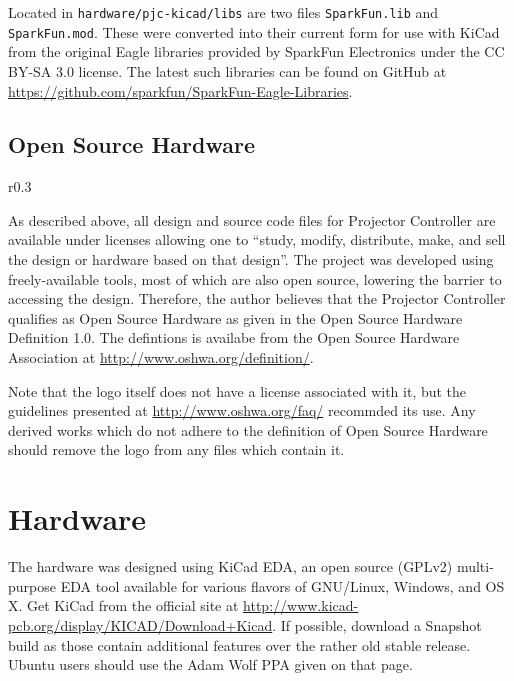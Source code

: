 \documentclass{article}
\begin{document}
Located in \texttt{hardware/pjc-kicad/libs} are two files \texttt{SparkFun.lib} and
\texttt{SparkFun.mod}.  These were converted into their current form for use with KiCad from the
original Eagle libraries provided by SparkFun Electronics under the CC BY-SA 3.0 license.  The
latest such libraries can be found on GitHub at
\url{https://github.com/sparkfun/SparkFun-Eagle-Libraries}.

\subsection{Open Source Hardware}
\begin{wrapfigure}{r}{0.3\textwidth}
    \begin{center}
    \end{center}
\end{wrapfigure}

As described above, all design and source code files for Projector Controller are available under
licenses allowing one to ``study, modify, distribute, make, and sell the design or hardware based on
that design''.  The project was developed using freely-available tools, most of which are also open
source, lowering the barrier to accessing the design.  Therefore, the author believes that the
Projector Controller qualifies as Open Source Hardware as given in the Open Source Hardware
Definition 1.0.  The defintions is availabe from the Open Source Hardware Association at
\url{http://www.oshwa.org/definition/}.

Note that the logo itself does not have a license associated with it, but the guidelines presented
at \url{http://www.oshwa.org/faq/} recommded its use.  Any derived works which do not adhere to the
definition of Open Source Hardware should remove the logo from any files which contain it.


\section{Hardware} \label{Hardware_sec}
The hardware was designed using KiCad EDA, an open source (GPLv2) multi-purpose EDA tool available
for various flavors of GNU/Linux, Windows, and OS X.  Get KiCad from the official site at
\url{http://www.kicad-pcb.org/display/KICAD/Download+Kicad}.  If possible, download a Snapshot build
as those contain additional features over the rather old stable release.  Ubuntu users should use
the Adam Wolf PPA given on that page.
\end{document}
